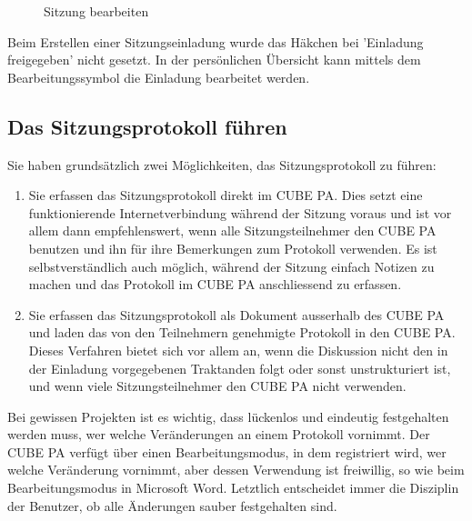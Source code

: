\begin{figure}[H]
\caption{Sitzung bearbeiten}
\end{figure}

\begin{small}
Beim Erstellen einer Sitzungseinladung wurde das Häkchen bei 'Einladung freigegeben' nicht gesetzt. In der persönlichen Übersicht kann mittels dem Bearbeitungssymbol die Einladung bearbeitet werden.
\end{small}


\subsection{Das Sitzungsprotokoll führen}

Sie haben grundsätzlich zwei Möglichkeiten, das Sitzungsprotokoll zu führen:

\begin{enumerate}
\item
Sie erfassen das Sitzungsprotokoll direkt im CUBE PA. Dies setzt eine funktionierende Internetverbindung während der Sitzung voraus und ist vor allem dann empfehlenswert, wenn alle Sitzungsteilnehmer den CUBE PA benutzen und ihn für ihre Bemerkungen zum Protokoll verwenden. Es ist selbstverständlich auch möglich, während der Sitzung einfach Notizen
zu machen und das Protokoll im CUBE PA anschliessend zu erfassen.
\item
Sie erfassen das Sitzungsprotokoll als Dokument ausserhalb des CUBE PA und laden das von den Teilnehmern genehmigte Protokoll in den CUBE PA. Dieses Verfahren bietet sich vor allem an, wenn die Diskussion nicht den in der Einladung vorgegebenen Traktanden folgt oder sonst unstrukturiert ist, und wenn viele Sitzungsteilnehmer den CUBE PA nicht
verwenden.
\end{enumerate}

Bei gewissen Projekten ist es wichtig, dass lückenlos und eindeutig festgehalten werden muss, wer welche Veränderungen an einem Protokoll vornimmt. Der CUBE PA verfügt über einen Bearbeitungsmodus, in dem registriert wird, wer welche Veränderung vornimmt, aber dessen Verwendung ist freiwillig, so wie beim Bearbeitungsmodus in Microsoft Word. Letztlich
entscheidet immer die Disziplin der Benutzer, ob alle Änderungen sauber festgehalten sind.

